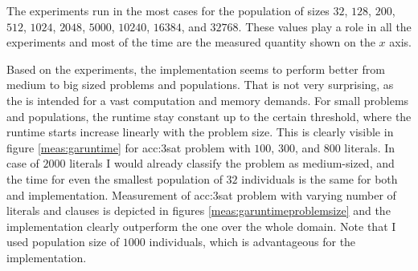 The experiments run in the most cases for the population of sizes $32$, $128$, $200$, $512$, $1024$, $2048$, $5000$, $10240$, $16384$, and $32768$. These values play a role in all the experiments and most of the time are the measured quantity shown on the $x$ axis.

Based on the experiments, the \cuda implementation seems to perform better from medium to big sized problems and populations. That is not very surprising, as the \gpu is intended for a vast computation and memory demands. For small problems and populations, the runtime stay constant up to the certain threshold, where the runtime starts increase linearly with the problem size. This is clearly visible in figure \ref{meas:garuntime} for \acrshort{acc:3sat} problem with $100$, $300$, and $800$ literals. In case of $2000$ literals I would already classify the problem as medium-sized, and the time for even the smallest population of $32$ individuals is the same for both \cpu and \gpu implementation. Measurement of \acrshort{acc:3sat} problem with varying number of literals and clauses is depicted in figures \ref{meas:garuntimeproblemsize} and the \gpu implementation clearly outperform the \cpu one over the whole domain. Note that I used population size of $1000$ individuals, which is advantageous for the \gpu implementation.

